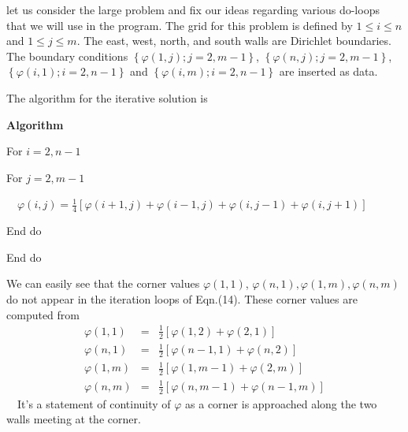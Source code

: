 \documentclass[a4paper]{article}
\newcommand{\tmtextbf}[1]{{\bfseries{#1}}}
\newcommand{\tmtextup}[1]{{\upshape{#1}}}
\newenvironment{tmindent}{\begin{tmparmod}{1.5em}{0pt}{0pt} }{\end{tmparmod}}
\newenvironment{tmparmod}[3]{\begin{list}{}{\setlength{\topsep}{0pt}\setlength{\leftmargin}{#1}\setlength{\rightmargin}{#2}\setlength{\parindent}{#3}\setlength{\listparindent}{\parindent}\setlength{\itemindent}{\parindent}\setlength{\parsep}{\parskip}} \item[]}{\end{list}}
\newenvironment{tmparsep}[1]{\begingroup\setlength{\parskip}{#1}}{\endgroup}
\begin{document}
let us consider the large problem and fix our ideas regarding various do-loops
that we will use in the program. The grid for this problem is defined by $1
\leqslant i \leqslant n$ and $1  \leqslant j \leqslant m$. The east, west,
north, and south walls are Dirichlet boundaries. The boundary conditions
$\left\{ \varphi \left( 1, j \right) ; j = 2, m - 1 \right\}$, $\left\{
\varphi \left( n, j \right) ; j = 2, m - 1 \right\} $, $\left\{
\varphi \left( i, 1 \right) ; i = 2, n - 1 \right\}$ and $\left\{ \varphi
\left( i, m \right) ; i = 2, n - 1 \right\}$ are inserted as data.

The algorithm for the iterative solution is {\cite{Ambar}}

{\noindent}\begin{tmparsep}{0em}
  \tmtextbf{Algorithm \tmtextup{1}}{\smallskip}
  \begin{tmindent}
    For $i = 2, n - 1$

    For $j = 2, m - 1$

    \ \ $\varphi \left( i, j \right) = \frac{1}{4} \left[ \varphi \left( i +
    1, j \right) + \varphi \left( i - 1, j \right) + \varphi \left( i, j - 1
    \right) + \varphi \left( i, j + 1 \right) \right]$

    End do

    End do
  \end{tmindent}
\end{tmparsep}{\hspace*{\fill}}{\medskip}

We can easily see that the corner values $\varphi \left( 1, 1 \right)$,
$\varphi \left( n, 1 \right), \varphi \left( 1, m \right), \varphi \left( n, m
\right)$ do not appear in the iteration loops of Eqn.(14). These corner values
are computed from
\begin{eqnarray*}
  \varphi \left( 1, 1 \right) & = & \frac{1}{2} \left[ \varphi \left( 1, 2
  \right) + \varphi \left( 2, 1 \right) \right]\\
  \varphi \left( n, 1 \right) & = & \frac{1}{2} \left[ \varphi \left( n - 1, 1
  \right) + \varphi \left( n, 2 \right) \right]\\
  \varphi \left( 1, m \right) & = & \frac{1}{2} \left[ \varphi \left( 1, m - 1
  \right) + \varphi \left( 2, m \right) \right]\\
  \varphi \left( n, m \right) & = & \frac{1}{2} \left[ \varphi \left( n, m - 1
  \right) + \varphi \left( n - 1, m \right) \right]
\end{eqnarray*}
\ \ It's a statement of continuity of $\varphi$ as a corner is approached
along the two walls meeting at the corner.
\end{document}

